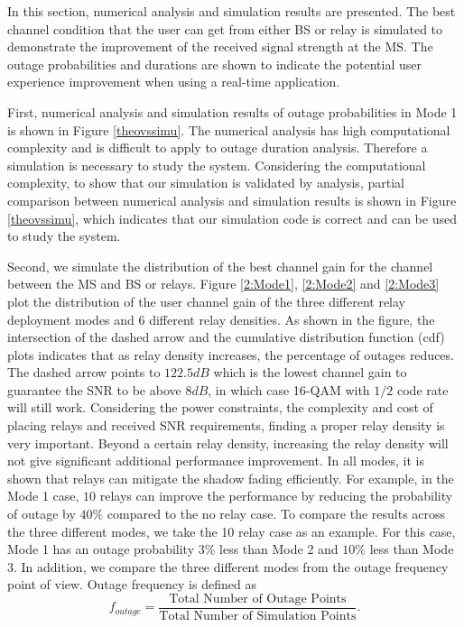 \par In this section, numerical analysis and simulation results are presented. The best channel condition that the user can get from either BS or relay is simulated to demonstrate the improvement of the received signal strength at the MS. The outage probabilities and durations are shown to indicate the potential user experience improvement when using a real-time application.
\par First, numerical analysis and simulation results of outage probabilities in Mode 1 is shown in Figure \ref{theovssimu}. The numerical analysis has high computational complexity and is difficult to apply to outage duration analysis. Therefore a simulation is necessary to study the system. Considering the computational complexity, to show that our simulation is validated by analysis, partial comparison between numerical analysis and simulation results is shown in Figure \ref{theovssimu}, which indicates that our simulation code is correct and can be used to study the system.
\par Second, we simulate the distribution of the best channel gain for the channel between the MS and BS or relays. Figure \ref{2:Mode1}, \ref{2:Mode2}  and \ref{2:Mode3} plot the distribution of the user channel gain of the three different relay deployment modes and 6 different relay densities. As shown in the figure, the intersection of the dashed arrow and the cumulative distribution function (cdf) plots indicates that as relay density increases, the percentage of outages reduces. The dashed arrow points to $122.5dB$ which is the lowest channel gain to guarantee the SNR to be above $8dB$, in which case 16-QAM with $1/2$ code rate will still work. Considering the power constraints, the complexity and cost of placing relays and received SNR requirements, finding a proper relay density is very important. Beyond a certain relay density, increasing the relay density will not give significant additional performance improvement. In all modes, it is shown that relays can mitigate the shadow fading efficiently. For example, in the Mode 1 case, $10$ relays can improve the performance by reducing the probability of outage by $40\%$ compared to the no relay case. To compare the results across the three different modes, we take the 10 relay case as an example. For this case, Mode 1 has an outage probability $3\%$ less than Mode 2 and $10\%$ less than Mode 3. In addition, we compare the three different modes from the outage frequency point of view. Outage frequency is defined as
\begin{equation}
f_{outage}=\frac{\text{Total Number of Outage Points}}{\text{Total Number of Simulation Points}}.
\end{equation}
